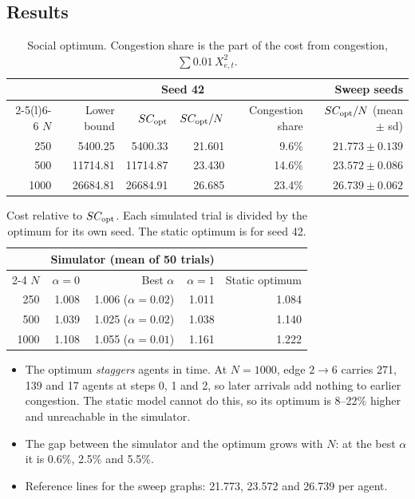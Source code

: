 \documentclass[11pt]{article}
\begin{document}
\subsection{Results}

\begin{table}[H]
\centering
\begin{tabular}{@{}rrrrrr@{}}
\toprule
& \multicolumn{4}{c}{Seed 42} & Sweep seeds \\
\cmidrule(lr){2-5}\cmidrule(l){6-6}
$N$ & Lower bound & $SC_{\mathrm{opt}}$ & $SC_{\mathrm{opt}}/N$ & Congestion share & $SC_{\mathrm{opt}}/N$ (mean $\pm$ sd) \\
\midrule
250  & 5400.25  & 5400.33  & 21.601 & 9.6\%  & $21.773 \pm 0.139$ \\
500  & 11714.81 & 11714.87 & 23.430 & 14.6\% & $23.572 \pm 0.086$ \\
1000 & 26684.81 & 26684.91 & 26.685 & 23.4\% & $26.739 \pm 0.062$ \\
\bottomrule
\end{tabular}
\caption{Social optimum. Congestion share is the part of the cost from congestion,
$\sum 0.01\,X_{e,t}^2$.}
\end{table}

\begin{table}[H]
\centering
\begin{tabular}{@{}rrrrr@{}}
\toprule
& \multicolumn{3}{c}{Simulator (mean of 50 trials)} & \\
\cmidrule(lr){2-4}
$N$ & $\alpha = 0$ & Best $\alpha$ & $\alpha = 1$ & Static optimum \\
\midrule
250  & 1.008 & 1.006 ($\alpha = 0.02$) & 1.011 & 1.084 \\
500  & 1.039 & 1.025 ($\alpha = 0.02$) & 1.038 & 1.140 \\
1000 & 1.108 & 1.055 ($\alpha = 0.01$) & 1.161 & 1.222 \\
\bottomrule
\end{tabular}
\caption{Cost relative to $SC_{\mathrm{opt}}$. Each simulated trial is divided by the optimum for its own seed. The
static optimum is for seed 42.}
\end{table}

\begin{itemize}
  \item The optimum \emph{staggers} agents in time. At $N = 1000$, edge $2 \to 6$ carries 271, 139 and 17
        agents at steps 0, 1 and 2, so later arrivals add nothing to earlier congestion. The static model
        cannot do this, so its optimum is 8--22\% higher and unreachable in the simulator.
  \item The gap between the simulator and the optimum grows with $N$: at the best $\alpha$ it is 0.6\%,
        2.5\% and 5.5\%.
  \item Reference lines for the sweep graphs: 21.773, 23.572 and 26.739 per agent.
\end{itemize}
\end{document}
